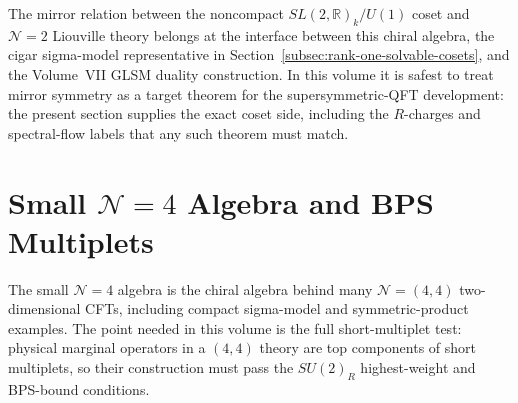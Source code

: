 The mirror relation between the noncompact \(SL(2,\mathbb R)_k/U(1)\)
coset and \(\mathcal N=2\) Liouville theory belongs at the interface between
this chiral algebra, the cigar sigma-model representative in
Section~\ref{subsec:rank-one-solvable-cosets}, and the Volume~VII GLSM
duality construction.  In this volume it is safest to treat mirror symmetry
as a target theorem for the supersymmetric-QFT development: the present
section supplies the exact coset side, including the \(R\)-charges and
spectral-flow labels that any such theorem must match.

\section{Small \texorpdfstring{\(\mathcal N=4\)}{N=4} Algebra and BPS Multiplets}
\label{sec:small-n4-algebra-bps-multiplets}

The small \(\mathcal N=4\) algebra is the chiral algebra behind many
\(\mathcal N=(4,4)\) two-dimensional CFTs, including compact sigma-model and
symmetric-product examples.  The point needed in this volume is the full
short-multiplet test: physical marginal operators in a \((4,4)\) theory are
top components of short multiplets, so their construction must pass the
\(SU(2)_R\) highest-weight and BPS-bound conditions.

